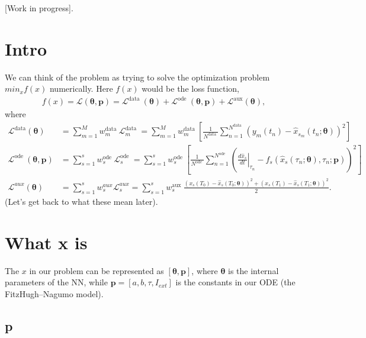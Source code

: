 \documentclass[a4paper]{article}
\begin{document}
[Work in progress].

\section{Intro}

We can think of the problem as trying to solve the optimization problem $min_x f(x)$ numerically. Here $f(x)$ would be the loss function,
\begin{align}
	f(x) = \mathcal{L}(\boldsymbol{\theta}, \mathbf{p})=\mathcal{L}^{\text {data }}(\boldsymbol{\theta})+\mathcal{L}^{\text {ode }}(\boldsymbol{\theta}, \mathbf{p})+\mathcal{L}^{\operatorname{aux}}(\boldsymbol{\theta}), 
\end{align}
where
\begin{align}
\mathcal{L}^{ \text{data}}(\boldsymbol{\theta}) &= \sum_{m=1}^{M} w_{m}^{\text {data }} \mathcal{L}_{m}^{\text {data }}=\sum_{m=1}^{M} w_{m}^{\text {data }}\left[\frac{1}{N^{\text {data }}} \sum_{n=1}^{N^{\text {data }}}\left(y_{m}\left(t_{n}\right)-\hat{x}_{s_{m}}\left(t_{n} ; \boldsymbol{\theta}\right)\right)^{2}\right] \\
\mathcal{L}^{\text {ode }}(\boldsymbol{\theta}, \mathbf{p}) &= \sum_{s=1}^{s} w_{s}^{\text {ode }} \mathcal{L}_{s}^{\text {ode }}=\sum_{s=1}^{s} w_{s}^{\text {ode }}\left[\frac{1}{N^{\text {ode }}} \sum_{n=1}^{N^{\text {ode }}}\left(\left.\frac{d \hat{x}_{s}}{d t}\right|_{\tau_{n}}-f_{s}\left(\hat{x}_{s}\left(\tau_{n} ; \boldsymbol{\theta}\right), \tau_{n} ; \mathbf{p}\right)\right)^{2}\right] \\
\mathcal{L}^{a u x}(\boldsymbol{\theta}) &= \sum_{s=1}^{s} w_{s}^{a u x} \mathcal{L}_{s}^{a u x}=\sum_{s=1}^{s} w_{s}^{\text {aux }} \frac{\left(x_{s}\left(T_{0}\right)-\hat{x}_{s}\left(T_{0} ; \boldsymbol{\theta}\right)\right)^{2}+\left(x_{s}\left(T_{1}\right)-\hat{x}_{s}\left(T_{1} ; \boldsymbol{\theta}\right)\right)^{2}}{2}.
\end{align}
(Let's get back to what these mean later).

\section{What x is}

The $x$ in our problem can be represented as $[\boldsymbol{\theta}, \mathbf{p}]$, where $\boldsymbol{\theta}$ is the internal parameters of the NN, while $\mathbf{p} = [a, b, \tau, I_{ext}]$ is the constants in our ODE (the FitzHugh–Nagumo model). 

\subsection{\textbf{p}}
\end{document}
